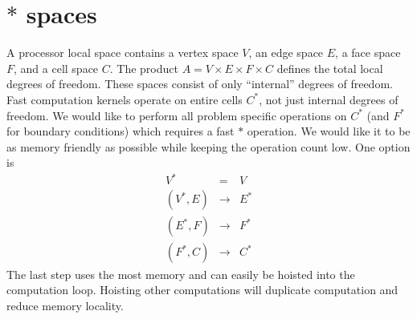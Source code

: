 \documentclass[a4paper]{article}
\begin{document}
\section{$*$ spaces}
A processor local space contains a vertex space $V$, an edge space $E$, a face
space $F$, and a cell space $C$.  The product $A = V \times E \times F \times C$
defines the total local degrees of freedom.  These spaces consist of only
``internal'' degrees of freedom.  Fast computation kernels operate on entire
cells $C^*$, not just internal degrees of freedom.  We would like to perform all
problem specific operations on $C^*$ (and $F^*$ for boundary conditions) which
requires a fast $*$ operation.  We would like it to be as memory friendly as
possible while keeping the operation count low.  One option is
\begin{eqnarray*}  \label{eq:star}
  V^* &=& V \\
  (V^*,E) &\to& E^* \\
  (E^*,F) &\to& F^* \\
  (F^*,C) &\to& C^*
\end{eqnarray*}
The last step uses the most memory and can easily be hoisted into the
computation loop.  Hoisting other computations will duplicate computation and
reduce memory locality.
\end{document}
